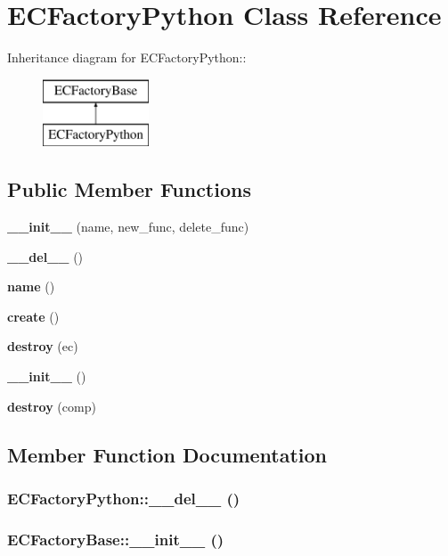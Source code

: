 \section{ECFactory\-Python Class Reference}
\label{classECFactoryPython}
Inheritance diagram for ECFactory\-Python::\begin{figure}[H]
\begin{center}
\leavevmode
\includegraphics[height=2cm]{classECFactoryPython}
\end{center}
\end{figure}
\subsection*{Public Member Functions}
\begin{CompactItemize}
\item 
{\bf \_\-\_\-init\_\-\_\-} (name, new\_\-func, delete\_\-func)
\item 
{\bf \_\-\_\-del\_\-\_\-} ()
\item 
{\bf name} ()
\item 
{\bf create} ()
\item 
{\bf destroy} (ec)
\item 
{\bf \_\-\_\-init\_\-\_\-} ()
\item 
{\bf destroy} (comp)
\end{CompactItemize}


\subsection{Member Function Documentation}
\subsubsection{\setlength{\rightskip}{0pt plus 5cm}ECFactory\-Python::\_\-\_\-del\_\-\_\- ()}\label{classECFactoryPython_ECFactoryPythona1}


\subsubsection{\setlength{\rightskip}{0pt plus 5cm}ECFactory\-Base::\_\-\_\-init\_\-\_\- ()\hspace{0.3cm}{\tt  [inherited]}}\label{classECFactoryBase_ECFactoryPythona5}


